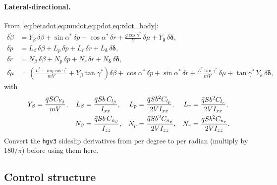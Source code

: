\documentclass[11pt]{report}
\numberwithin{equation}{chapter}
\newcommand{\vb}[1]{\bm{#1}}
\newcommand{\code}[1]{\texttt{#1}}
\begin{document}
\paragraph{Lateral-directional.} From \cref{eq:betadot,eq:mudot,eq:pdot,eq:rdot_body}:
\begin{align}
  \delta\dot\beta &= Y_\beta\,\delta\beta + \sin\alpha^*\,\delta p - \cos\alpha^*\,\delta r
     + \frac{g\cos\gamma^*}{V}\,\delta\mu + Y_{\vb\delta}\,\delta\vb\delta, \\
  \delta\dot p &= L_\beta\,\delta\beta + L_p\,\delta p + L_r\,\delta r + L_{\vb\delta}\,\delta\vb\delta, \\
  \delta\dot r &= N_\beta\,\delta\beta + N_p\,\delta p + N_r\,\delta r + N_{\vb\delta}\,\delta\vb\delta, \\
  \delta\dot\mu &= \left(\frac{L^* - m g\cos\gamma^*}{m V} + Y_\beta\tan\gamma^*\right)\delta\beta
     + \cos\alpha^*\,\delta p + \sin\alpha^*\,\delta r + \frac{L^*\tan\gamma^*}{m V}\,\delta\mu
     + \tan\gamma^*\,Y_{\vb\delta}\,\delta\vb\delta ,
\end{align}
with
\begin{align}
  Y_\beta &= \frac{\bar q S C_{Y_\beta}}{m V}, &
  L_\beta &= \frac{\bar q S b\, C_{l_\beta}}{I_{xx}}, &
  L_p &= \frac{\bar q S b^2 C_{l_p}}{2 V I_{xx}}, &
  L_r &= \frac{\bar q S b^2 C_{l_r}}{2 V I_{xx}}, \notag\\
  & &
  N_\beta &= \frac{\bar q S b\, C_{n_\beta}}{I_{zz}}, &
  N_p &= \frac{\bar q S b^2 C_{n_p}}{2 V I_{zz}}, &
  N_r &= \frac{\bar q S b^2 C_{n_r}}{2 V I_{zz}}.
\end{align}
Convert the \code{hgv3} sideslip derivatives from per degree to per radian (multiply by
$180/\pi$) before using them here.

\subsection{Control structure}
\end{document}
